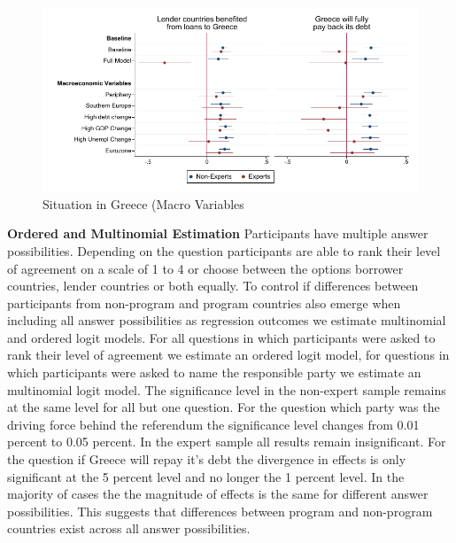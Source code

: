 \begin{figure}[h!]
    \begin{center}
     \caption{Situation in Greece (Macro Variables}
    \includegraphics[scale=1.2]{macro_S_1601_S_1701.pdf}
    \end{center}
    \tiny
\end{figure}
    \clearpage
\textbf{Ordered and Multinomial Estimation}
Participants have multiple answer possibilities. Depending on the question participants are able to rank their level of agreement on a scale of 1 to 4 or choose between the options borrower countries, lender countries or both equally. To control if differences between participants from non-program and program countries also emerge when including all answer possibilities as regression outcomes we estimate multinomial and ordered logit models. For all questions in which participants were asked to rank their level of agreement we estimate an ordered logit model, for questions in which participants were asked to name the responsible party we estimate an multinomial logit model. The significance level in the non-expert sample remains at the same level for all but one question. For the question which party was the driving force behind the referendum the significance level changes from 0.01 percent to 0.05 percent. In the expert sample all results remain insignificant. For the question if Greece will repay it's debt the divergence in effects is only significant at the 5 percent level and no longer the 1 percent level. In the majority of cases the the magnitude of effects is the same for different answer possibilities. This suggests that differences between program and non-program countries exist across all answer possibilities. \\

